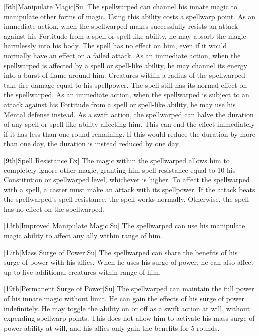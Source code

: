 [5th]{Manipulate Magic}[Su]
The spellwarped can channel his innate magic to manipulate other forms of magic.
Using this ability costs a spellwarp point.
    As an immediate action, when the spellwarped makes successfully resists an attack against his Fortitude from a spell or spell-like ability, he may absorb the magic harmlessly into his body.
    The spell has no effect on him, even if it would normally have an effect on a failed attack.
    As an immediate action, when the spellwarped is affected by a spell or spell-like ability, he may channel its energy into a burst of flame around him.
    Creatures within a \areasmall radius of the spellwarped take fire damage equal to his spellpower.
    The spell still has its normal effect on the spellwarped.
    As an immediate action, when the spellwarped is subject to an attack against his Fortitude from a spell or spell-like ability, he may use his Mental defense instead.
    As a swift action, the spellwarped can halve the duration of any spell or spell-like ability affecting him.
    This can end the effect immediately if it has less than one round remaining.
    If this would reduce the duration by more than one day, the duration is instead reduced by one day.

[9th]{Spell Resistance}[Ex]
The magic within the spellwarped allows him to completely ignore other magic, granting him spell resistance equal to 10 \add his Constitution or spellwarped level, whichever is higher.
To affect the spellwarped with a spell, a caster must make an attack with its spellpower.
If the attack beats the spellwarped's spell resistance, the spell works normally.
Otherwise, the spell has no effect on the spellwarped.

[13th]{Improved Manipulate Magic}[Su]
The spellwarped can use his manipulate magic ability to affect any ally within \rngmed range of him.

[17th]{Mass Surge of Power}[Su]
The spellwarped can share the benefits of his surge of power with his allies.
When he uses his surge of power, he can also affect up to five additional creatures within \rngmed range of him.

[19th]{Permanent Surge of Power}[Su]
The spellwarped can maintain the full power of his innate magic without limit.
He can gain the effects of his surge of power indefinitely.
He may toggle the ability on or off as a swift action at will, without expending spellwarp points.
This does not allow him to activate his mass surge of power ability at will, and his allies only gain the benefits for 5 rounds.

